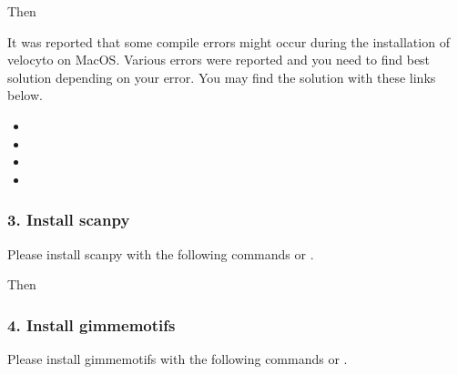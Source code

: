 \documentclass[letterpaper,10pt,english]{sphinxmanual}
\begin{document}
Then

\begin{sphinxVerbatim}[commandchars=\\\{\}]
  
\end{sphinxVerbatim}

It was reported that some compile errors might occur during the installation of velocyto on MacOS.
Various errors were reported and you need to find best solution depending on your error.
You may find the solution with these links below.
\begin{itemize}
\item {} 

\item {} 

\item {} 

\item {} 

\end{itemize}


\subsubsection{3. Install scanpy}
\label{\detokenize{installation/index:install-scanpy}}
Please install scanpy with the following commands or  .

\begin{sphinxVerbatim}[commandchars=\\\{\}]
       
\end{sphinxVerbatim}

Then

\begin{sphinxVerbatim}[commandchars=\\\{\}]
  
\end{sphinxVerbatim}


\subsubsection{4. Install gimmemotifs}
\label{\detokenize{installation/index:install-gimmemotifs}}
Please install gimmemotifs with the following commands or  .
\end{document}

